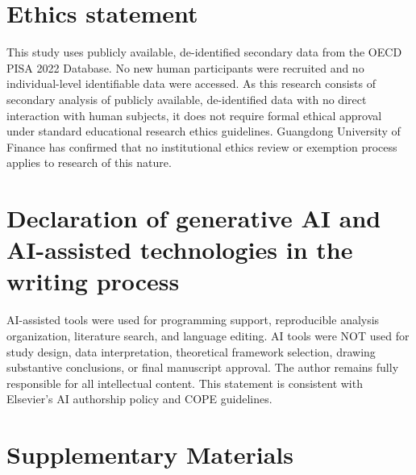 \documentclass[review,12pt]{elsarticle}
\begin{document}
\section*{Ethics statement}

This study uses publicly available, de-identified secondary data from the OECD PISA 2022 Database. No new human participants were recruited and no individual-level identifiable data were accessed. As this research consists of secondary analysis of publicly available, de-identified data with no direct interaction with human subjects, it does not require formal ethical approval under standard educational research ethics guidelines. Guangdong University of Finance has confirmed that no institutional ethics review or exemption process applies to research of this nature.

\section*{Declaration of generative AI and AI-assisted technologies in the writing process}

AI-assisted tools were used for programming support, reproducible analysis organization, literature search, and language editing. AI tools were NOT used for study design, data interpretation, theoretical framework selection, drawing substantive conclusions, or final manuscript approval. The author remains fully responsible for all intellectual content. This statement is consistent with Elsevier's AI authorship policy and COPE guidelines.


\FloatBarrier



\clearpage
\section*{Supplementary Materials}











\end{document}
